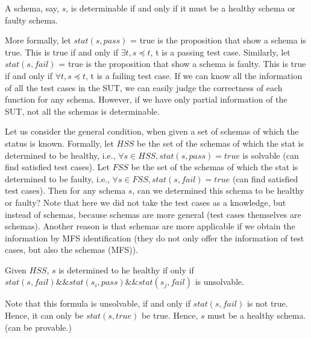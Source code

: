 \begin{definition}\label{de:deteminable}
A schema, say, $s$, is determinable if and only if it must be a healthy schema or faulty schema.
\end{definition}


More formally, let $stat(s, pass)$  = true is the proposition that show a schema is true. This is true if and only if $\exists t, s \preceq t$, t is a passing test case.  Similarly,  let $stat(s, fail)$  = true is the proposition that show  a schema is faulty. This is true if and only if $\forall t, s \preceq t$, t is a failing test case. If we can know all the information of all the test cases in the SUT, we can easily judge the correctness of each function for any schema. However, if we have only partial information of the SUT, not all the schemas is determinable.

Let us consider the general condition, when given a set of schemas of which the status is known. Formally, let $HSS$ be the set of the schemas of which the stat is determined to be healthy, i.e., $\forall s \in HSS, stat(s, pass) = true$ is solvable (can find satisfied test cases). Let $FSS$ be the set of the schemas of which the stat is determined to be faulty, i.e., $\forall s \in FSS, stat(s, fail) = true$ (can find satisfied test cases).  Then for any schema $s$, can we determined this schema to be healthy or faulty? Note that here we did not take the test cases as a knowledge, but instead of schemas, because schemas are more general (test cases themselves are schemas). Another reason is that schemas are more applicable if we obtain the information by MFS identification (they do not only offer the information of test cases, but also the schemas (MFS)).


\begin{proposition}\label{pro:determinableparthealthy}
Given $HSS$, $s$ is determined to he healthy if only if $stat(s, fail) \&\& stat(s_{i}, pass) \&\& stat(s_{j}, fail)$ is unsolvable.
\end{proposition}

Note that this formula is unsolvable, if and only if $stat(s, fail)$ is not true. Hence, it can only be $stat(s, true)$ be true. Hence, $s$ must be a healthy schema.  (can be provable.)

